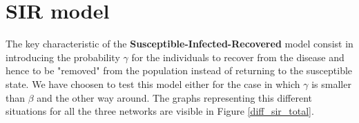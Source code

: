 \section{SIR model} %
\label{sec:sir_model}
    The key characteristic of the \textbf{Susceptible-Infected-Recovered} model consist in introducing the
    probability $\gamma$ for the individuals to recover from the disease and hence to be "removed" from the
    population instead of returning to the susceptible state. We have choosen to test this model either for the case
    in which $\gamma$ is smaller than $\beta$ and the other way around. The graphs representing this different
    situations for all the three networks are visible in Figure \ref{diff_sir_total}.
    \begin{figure}
        \begin{subfigure}{0.33\textwidth}
            \caption{}
            \label{diff_sir_smaller}
        \end{subfigure}
        \begin{subfigure}{0.33\textwidth}
\end{subfigure}
\end{figure}
